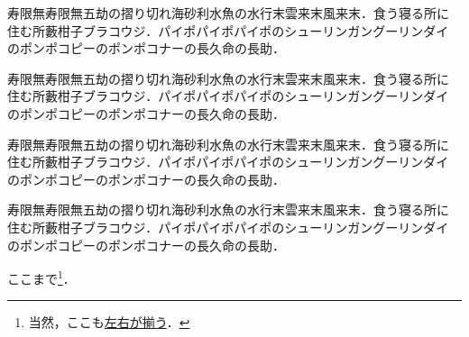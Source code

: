 \documentclass[a4j, 12Q, twocolumn, twoside]{jsarticle}
\begin{document}
寿限無寿限無五劫の摺り切れ海砂利水魚の水行末雲来末風来末．食う寝る所に
住む所藪柑子ブラコウジ．パイポパイポパイポのシューリンガングーリンダイ
のポンポコピーのポンポコナーの長久命の長助．

寿限無寿限無五劫の摺り切れ海砂利水魚の水行末雲来末風来末．食う寝る所に
住む所藪柑子ブラコウジ．パイポパイポパイポのシューリンガングーリンダイ
のポンポコピーのポンポコナーの長久命の長助．

寿限無寿限無五劫の摺り切れ海砂利水魚の水行末雲来末風来末．食う寝る所に
住む所藪柑子ブラコウジ．パイポパイポパイポのシューリンガングーリンダイ
のポンポコピーのポンポコナーの長久命の長助．

寿限無寿限無五劫の摺り切れ海砂利水魚の水行末雲来末風来末．食う寝る所に
住む所藪柑子ブラコウジ．パイポパイポパイポのシューリンガングーリンダイ
のポンポコピーのポンポコナーの長久命の長助．

ここまで\footnote{当然，ここも\underline{左右が揃う}．}．
\end{document}
